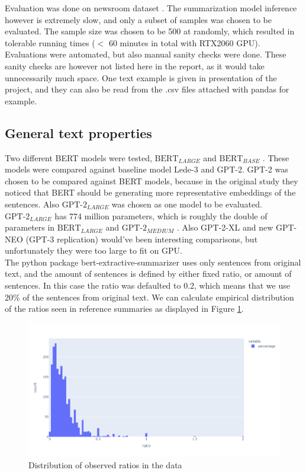 \documentclass{article}
\newcommand{\bertlarge}{$\text{BERT}_{LARGE}$ }
\newcommand{\bertbase}{$\text{BERT}_{BASE}$ }
\newcommand{\gptmedium}{$\text{GPT-2}_{MEDIUM}$ }
\newcommand{\gptlarge}{$\text{GPT-2}_{LARGE}$ }
\begin{document}
Evaluation was done on newsroom dataset \cite{dataset}. The summarization model inference however is extremely slow, and only a subset of samples was chosen to be evaluated. The sample size was chosen to be 500 at randomly, which resulted in tolerable running times ($<$ 60 minutes in total with RTX2060 GPU). Evaluations were automated, but also manual sanity checks were done. These sanity checks are however not listed here in the report, as it would take unnecessarily much space. One text example is given in presentation of the project, and they can also be read from the .csv files attached with pandas for example. \\

\subsection{General text properties}

\noindent
Two different BERT models were tested, \bertlarge and \bertbase. These models were compared against baseline model Lede-3 and GPT-2. GPT-2 was chosen to be compared against BERT models, because in the original study \cite{extractive_bert} they noticed that BERT should be generating more representative embeddings of the sentences. Also \gptlarge was chosen as one model to be evaluated. \gptlarge has 774 million parameters, which is roughly the double of parameters in \bertlarge and \gptmedium. Also GPT-2-XL and new GPT-NEO (GPT-3 replication) would've been interesting comparisons, but unfortunately they were too large to fit on GPU.\\

\noindent
The python package bert-extractive-summarizer \cite{extractive_bert} uses only sentences from original text, and the amount of sentences is defined by either fixed ratio, or amount of sentences. In this case the ratio was defaulted to 0.2, which means that we use 20\% of the sentences from original text. We can calculate empirical distribution of the ratios seen in reference summaries as displayed in Figure \ref{fig:empirical_ratio}.


\noindent
\begin{figure}[H]
	\centering
	\includegraphics[scale=0.4]{empirical_ratio.png}
	\caption{Distribution of observed ratios in the data}
	\label{fig:empirical_ratio}
\end{figure}
\end{document}
